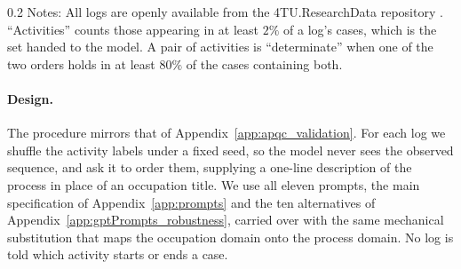 \begin{table}[!t]
    \caption{Event Logs Used for Validation}
    \label{tab:eventlog_overview}
    \begin{center}
    \end{center}
    \par\vspace{\fignotesskip}
\begin{minipage}{1\linewidth}
\begin{spacing}{0.2}
{\fontsize{9.5pt}{10pt}\selectfont Notes: All logs are openly available from the 4TU.ResearchData repository \citep{bpi2017_log, bpi2020_log, roadfines_log, sepsis_log}.
``Activities'' counts those appearing in at least $2\%$ of a log's cases, which is the set handed to the model.
A pair of activities is ``determinate'' when one of the two orders holds in at least $80\%$ of the cases containing both.}
\end{spacing}
\end{minipage}
\end{table}

\paragraph{Design.}
\label{app:eventlog_design}
The procedure mirrors that of Appendix~\ref{app:apqc_validation}.
For each log we shuffle the activity labels under a fixed seed, so the model never sees the observed sequence, and ask it to order them, supplying a one-line description of the process in place of an occupation title.
We use all eleven prompts, the main specification of Appendix~\ref{app:prompts} and the ten alternatives of Appendix~\ref{app:gptPrompts_robustness}, carried over with the same mechanical substitution that maps the occupation domain onto the process domain.
No log is told which activity starts or ends a case.

